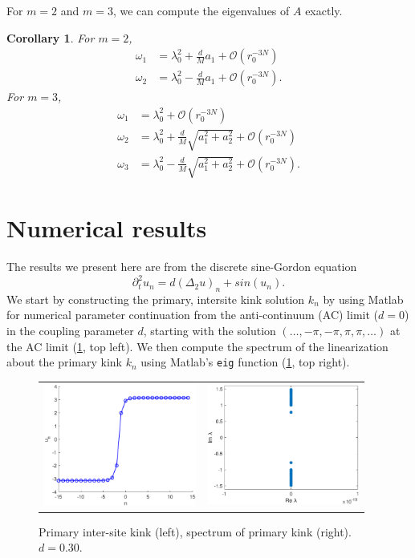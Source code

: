 \documentclass[12pt]{article}
\newtheorem{corollary}{Corollary}
\begin{document}
\noindent For $m = 2$ and $m = 3$, we can compute the eigenvalues of $A$ exactly.

\begin{corollary}\label{corr:m23}
For $m = 2$, 
\begin{align*}
	\omega_1 &= \lambda_0^2 + \frac{d}{M}a_1 + \mathcal{O}(r_0^{-3N}) \\
	\omega_2 &= \lambda_0^2 - \frac{d}{M}a_1 + \mathcal{O}(r_0^{-3N}).
\end{align*}
For $m = 3$,
\begin{align*}
	\omega_1 &= \lambda_0^2 + \mathcal{O}(r_0^{-3N}) \\
	\omega_2 &= \lambda_0^2 + \frac{d}{M}\sqrt{a_1^2 + a_2^2} + \mathcal{O}(r_0^{-3N}) \\
	\omega_3 &= \lambda_0^2 - \frac{d}{M}\sqrt{a_1^2 + a_2^2} + \mathcal{O}(r_0^{-3N}).
\end{align*}
\end{corollary}

\section{Numerical results}

The results we present here are from the discrete sine-Gordon equation
\begin{equation}\label{eq:dSG}
	\partial_t^2 u_n = d (\Delta_2 u)_n + sin(u_n).
\end{equation}
We start by constructing the primary, intersite kink solution $k_n$ by using Matlab for numerical parameter continuation from the anti-continuum (AC) limit ($d = 0$) in the coupling parameter $d$, starting with the solution $(\dots, -\pi, -\pi, \pi, \pi, \dots)$ at the AC limit (\cref{fig:kink}, top left). We then compute the spectrum of the linearization about the primary kink $k_n$ using Matlab's \texttt{eig} function (\cref{fig:kink}, top right).

\begin{figure}[H]
\begin{center}
\begin{tabular}{cc}
\includegraphics[width=5cm]{1kink.eps}	&
\includegraphics[width=5cm]{1kinkspectrum.eps} 
\end{tabular}
\end{center}
\caption{Primary inter-site kink (left), spectrum of primary kink (right). $d = 0.30$.}
\label{fig:kink}
\end{figure}
\end{document}
